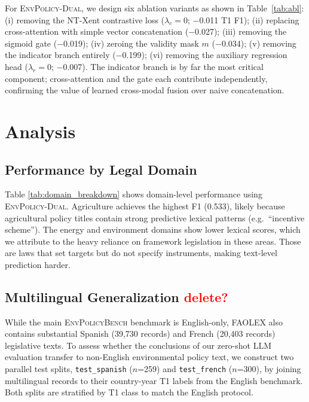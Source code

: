 \documentclass[11pt]{article}
\newcommand{\ours}{\textsc{EnvPolicy-Dual}}
\newcommand{\bench}{\textsc{EnvPolicyBench}}
\begin{document}
For \ours{}, we design six ablation variants as shown in Table~\ref{tab:abl}: (i) removing the NT-Xent contrastive loss ($\lambda_c=0$; $-$0.011 T1 F1); (ii) replacing cross-attention with simple vector concatenation ($-$0.027); (iii) removing the sigmoid gate ($-$0.019); (iv) zeroing the validity mask $m$ ($-$0.034); (v) removing the indicator branch entirely ($-$0.199); (vi) removing the auxiliary regression head ($\lambda_r=0$; $-$0.007). The indicator branch is by far the most critical component; cross-attention and the gate each contribute independently, confirming the value of learned cross-modal fusion over naive concatenation.

\section{Analysis}
\label{sec:analysis}

\subsection{Performance by Legal Domain}



Table \ref{tab:domain_breakdown} shows domain-level performance using  \ours.
Agriculture achieves the highest F1 (0.533), likely because agricultural
policy titles contain strong predictive lexical patterns (e.g.\ ``incentive
scheme''). The energy and environment domains show lower lexical scores, which we attribute to the heavy reliance on framework legislation in these areas. Those are laws that set targets but do not specify instruments, making text-level prediction harder. 

\subsection{Multilingual Generalization \textcolor{red}{delete?}}
\label{sec:multilingual}

While the main \bench{} benchmark is English-only, FAOLEX also contains
substantial Spanish (39{,}730 records) and French (20{,}403 records)
legislative texts. To assess whether the conclusions of our zero-shot LLM
evaluation transfer to non-English environmental policy text, we construct
two parallel test splits, \texttt{test\_spanish} ($n$=259) and
\texttt{test\_french} ($n$=300), by joining multilingual records to their
country-year T1 labels from the English benchmark. Both splits are
stratified by T1 class to match the English protocol.
\end{document}
